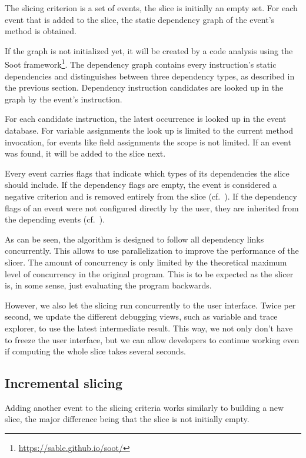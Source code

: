 ﻿\documentclass[
      english,
			conference,
      ]{IEEEtran}
\begin{document}
The slicing criterion is a set of events, the slice is initially an empty set.
For each event that is added to the slice, the static dependency graph of the event's method is obtained.

If the graph is not initialized yet, it will be created by a code analysis using the Soot framework\footnote{\url{https://sable.github.io/soot/}}.
The dependency graph contains every instruction's static dependencies and distinguishes between three dependency types, as described in the previous section.
Dependency instruction candidates are looked up in the graph by the event's instruction.

For each candidate instruction, the latest occurrence is looked up in the event database.
For variable assignments the look up is limited to the current method invocation, for events like field assignments the scope is not limited.
If an event was found, it will be added to the slice next.

Every event carries flags that indicate which types of its dependencies the slice should include.
If the dependency flags are empty, the event is considered a negative criterion and is removed entirely from the slice (cf.~).
If the dependency flags of an event were not configured directly by the user, they are inherited from the depending events (cf.~).

As can be seen, the algorithm is designed to follow all dependency links concurrently.
This allows to use parallelization to improve the performance of the slicer.
The amount of concurrency is only limited by the theoretical maximum level of concurrency in the original program.
This is to be expected as the slicer is, in some sense, just evaluating the program backwards.

However, we also let the slicing run concurrently to the user interface.
Twice per second, we update the different debugging views, such as variable and trace explorer, to use the latest intermediate result.
This way, we not only don't have to freeze the user interface, but we can allow developers to continue working even if computing the whole slice takes several seconds.

\subsection{Incremental slicing}

Adding another event to the slicing criteria works similarly to building a new slice, the major difference being that the slice is not initially empty.
\end{document}
